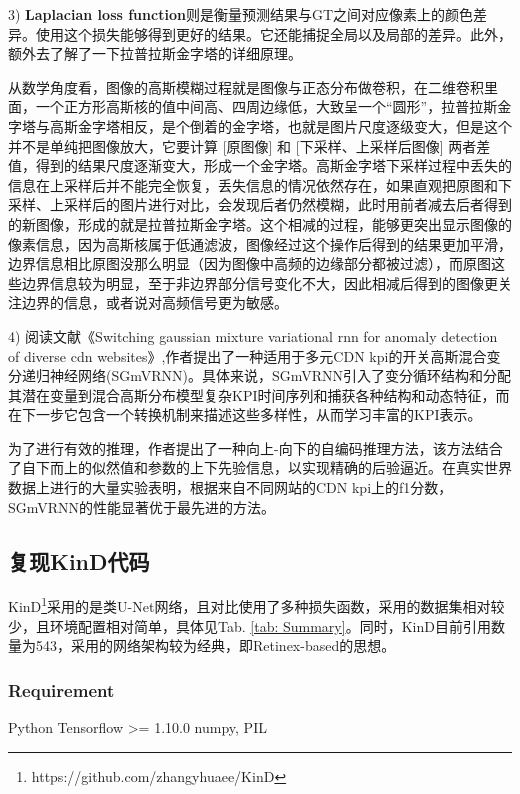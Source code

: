 \documentclass[letterpaper,12pt]{article}
\begin{document}
	3) \textbf{Laplacian loss function}则是衡量预测结果与GT之间对应像素上的颜色差异。使用这个损失能够得到更好的结果。它还能捕捉全局以及局部的差异。此外，额外去了解了一下拉普拉斯金字塔的详细原理。
	
	从数学角度看，图像的高斯模糊过程就是图像与正态分布做卷积，在二维卷积里面，一个正方形高斯核的值中间高、四周边缘低，大致呈一个“圆形”，拉普拉斯金字塔与高斯金字塔相反，是个倒着的金字塔，也就是图片尺度逐级变大，但是这个并不是单纯把图像放大，它要计算 [原图像] 和 [下采样、上采样后图像] 两者差值，得到的结果尺度逐渐变大，形成一个金字塔。高斯金字塔下采样过程中丢失的信息在上采样后并不能完全恢复，丢失信息的情况依然存在，如果直观把原图和下采样、上采样后的图片进行对比，会发现后者仍然模糊，此时用前者减去后者得到的新图像，形成的就是拉普拉斯金字塔。这个相减的过程，能够更突出显示图像的像素信息，因为高斯核属于低通滤波，图像经过这个操作后得到的结果更加平滑，边界信息相比原图没那么明显（因为图像中高频的边缘部分都被过滤），而原图这些边界信息较为明显，至于非边界部分信号变化不大，因此相减后得到的图像更关注边界的信息，或者说对高频信号更为敏感。

	4) 阅读文献《Switching gaussian mixture variational rnn for anomaly detection of diverse cdn websites》,作者提出了一种适用于多元CDN kpi的开关高斯混合变分递归神经网络(SGmVRNN)。具体来说，SGmVRNN引入了变分循环结构和分配其潜在变量到混合高斯分布模型复杂KPI时间序列和捕获各种结构和动态特征，而在下一步它包含一个转换机制来描述这些多样性，从而学习丰富的KPI表示。
	
	为了进行有效的推理，作者提出了一种向上-向下的自编码推理方法，该方法结合了自下而上的似然值和参数的上下先验信息，以实现精确的后验逼近。在真实世界数据上进行的大量实验表明，根据来自不同网站的CDN kpi上的f1分数，SGmVRNN的性能显著优于最先进的方法。
	
	
	\subsection{复现KinD代码}
	
	KinD\footnote{https://github.com/zhangyhuaee/KinD}采用的是类U-Net网络，且对比使用了多种损失函数，采用的数据集相对较少，且环境配置相对简单，具体见Tab. \ref{tab: Summary}。同时，KinD\cite{10.1145/3343031.3350926}目前引用数量为543，采用的网络架构较为经典，即Retinex-based的思想。
	
		\subsubsection{Requirement}
	
		\begin{python}
		Python
		Tensorflow >= 1.10.0
		numpy, PIL
		\end{python}
	
\end{document}
